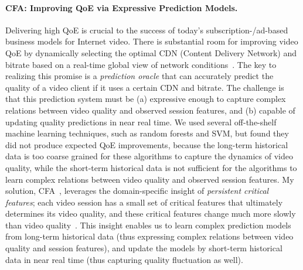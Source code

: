 \paragraph{CFA: Improving QoE via Expressive Prediction Models.}
Delivering high QoE is crucial to the success of today's subscription-/ad-based business models for Internet video.
There is substantial room for improving video QoE by dynamically selecting the optimal CDN (Content Delivery Network) and bitrate based on a real-time global view of network conditions~\cite{sigcomm-case,conext-shedding}.
The key to realizing this promise is a {\em prediction oracle} that can accurately predict the quality of a video client if it uses a certain CDN and bitrate.
The challenge is that this prediction system must be (a) expressive enough to capture complex relations between video quality and observed session features, and (b) capable of updating quality predictions in near real time.
We used several off-the-shelf machine learning techniques, such as random forests and SVM, but found they did not produce expected QoE improvements, because the long-term historical data is too coarse grained for these algorithms to capture the dynamics of video quality, while the short-term historical data is not sufficient for the algorithms to learn complex relations between video quality and observed session features.
My solution, CFA~\cite{cfa}, leverages the domain-specific insight of {\em persistent critical features}; each video session has a small set of critical features that ultimately determines its video quality, and these critical features change much more slowly than video quality~\cite{conext-shedding}. 
This insight enables us to learn complex prediction models from long-term historical data (thus expressing complex relations between video quality and session features), and update the models by short-term historical data in near real time (thus capturing quality fluctuation as well).
